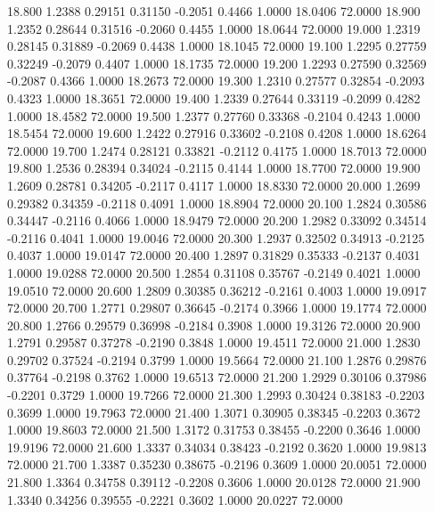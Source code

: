   18.800   1.2388   0.29151   0.31150  -0.2051   0.4466   1.0000  18.0406  72.0000
  18.900   1.2352   0.28644   0.31516  -0.2060   0.4455   1.0000  18.0644  72.0000
  19.000   1.2319   0.28145   0.31889  -0.2069   0.4438   1.0000  18.1045  72.0000
  19.100   1.2295   0.27759   0.32249  -0.2079   0.4407   1.0000  18.1735  72.0000
  19.200   1.2293   0.27590   0.32569  -0.2087   0.4366   1.0000  18.2673  72.0000
  19.300   1.2310   0.27577   0.32854  -0.2093   0.4323   1.0000  18.3651  72.0000
  19.400   1.2339   0.27644   0.33119  -0.2099   0.4282   1.0000  18.4582  72.0000
  19.500   1.2377   0.27760   0.33368  -0.2104   0.4243   1.0000  18.5454  72.0000
  19.600   1.2422   0.27916   0.33602  -0.2108   0.4208   1.0000  18.6264  72.0000
  19.700   1.2474   0.28121   0.33821  -0.2112   0.4175   1.0000  18.7013  72.0000
  19.800   1.2536   0.28394   0.34024  -0.2115   0.4144   1.0000  18.7700  72.0000
  19.900   1.2609   0.28781   0.34205  -0.2117   0.4117   1.0000  18.8330  72.0000
  20.000   1.2699   0.29382   0.34359  -0.2118   0.4091   1.0000  18.8904  72.0000
  20.100   1.2824   0.30586   0.34447  -0.2116   0.4066   1.0000  18.9479  72.0000
  20.200   1.2982   0.33092   0.34514  -0.2116   0.4041   1.0000  19.0046  72.0000
  20.300   1.2937   0.32502   0.34913  -0.2125   0.4037   1.0000  19.0147  72.0000
  20.400   1.2897   0.31829   0.35333  -0.2137   0.4031   1.0000  19.0288  72.0000
  20.500   1.2854   0.31108   0.35767  -0.2149   0.4021   1.0000  19.0510  72.0000
  20.600   1.2809   0.30385   0.36212  -0.2161   0.4003   1.0000  19.0917  72.0000
  20.700   1.2771   0.29807   0.36645  -0.2174   0.3966   1.0000  19.1774  72.0000
  20.800   1.2766   0.29579   0.36998  -0.2184   0.3908   1.0000  19.3126  72.0000
  20.900   1.2791   0.29587   0.37278  -0.2190   0.3848   1.0000  19.4511  72.0000
  21.000   1.2830   0.29702   0.37524  -0.2194   0.3799   1.0000  19.5664  72.0000
  21.100   1.2876   0.29876   0.37764  -0.2198   0.3762   1.0000  19.6513  72.0000
  21.200   1.2929   0.30106   0.37986  -0.2201   0.3729   1.0000  19.7266  72.0000
  21.300   1.2993   0.30424   0.38183  -0.2203   0.3699   1.0000  19.7963  72.0000
  21.400   1.3071   0.30905   0.38345  -0.2203   0.3672   1.0000  19.8603  72.0000
  21.500   1.3172   0.31753   0.38455  -0.2200   0.3646   1.0000  19.9196  72.0000
  21.600   1.3337   0.34034   0.38423  -0.2192   0.3620   1.0000  19.9813  72.0000
  21.700   1.3387   0.35230   0.38675  -0.2196   0.3609   1.0000  20.0051  72.0000
  21.800   1.3364   0.34758   0.39112  -0.2208   0.3606   1.0000  20.0128  72.0000
  21.900   1.3340   0.34256   0.39555  -0.2221   0.3602   1.0000  20.0227  72.0000

